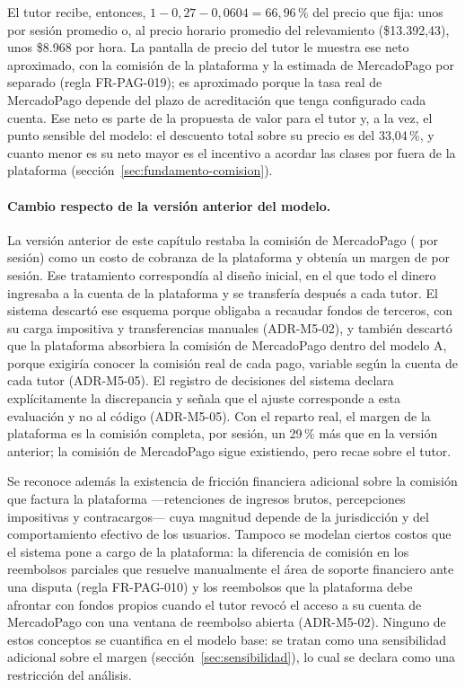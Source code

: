 El tutor recibe, entonces, $1 - 0{,}27 - 0{,}0604 = 66{,}96\,\%$ del
precio que fija: unos  por sesión promedio o, al precio horario
promedio del relevamiento (\$13.392,43), unos \$8.968 por hora. La pantalla
de precio del tutor le muestra ese neto aproximado, con la comisión de la
plataforma y la estimada de MercadoPago por separado (regla FR-PAG-019);
es aproximado porque la tasa real de MercadoPago depende del plazo de
acreditación que tenga configurado cada cuenta. Ese neto es parte de la
propuesta de valor para el tutor y, a la vez, el punto sensible del
modelo: el descuento total sobre su precio es del 33,04\,\%, y cuanto
menor es su neto mayor es el incentivo a acordar las clases por fuera de
la plataforma (sección~\ref{sec:fundamento-comision}).

\paragraph{Cambio respecto de la versión anterior del modelo.} La versión
anterior de este capítulo restaba la comisión de MercadoPago
( por sesión) como un costo de cobranza de la plataforma y
obtenía un margen de  por sesión. Ese tratamiento correspondía
al diseño inicial, en el que todo el dinero ingresaba a la cuenta de la
plataforma y se transfería después a cada tutor. El sistema descartó ese
esquema porque obligaba a recaudar fondos de terceros, con su carga
impositiva y transferencias manuales (ADR-M5-02), y también descartó que
la plataforma absorbiera la comisión de MercadoPago dentro del modelo A,
porque exigiría conocer la comisión real de cada pago, variable según la
cuenta de cada tutor (ADR-M5-05). El registro de decisiones del sistema
declara explícitamente la discrepancia y señala que el ajuste corresponde
a esta evaluación y no al código (ADR-M5-05). Con el reparto real, el
margen de la plataforma es la comisión completa,  por sesión,
un 29\,\% más que en la versión anterior; la comisión de MercadoPago sigue
existiendo, pero recae sobre el tutor.

Se reconoce además la existencia de fricción financiera adicional sobre la
comisión que factura la plataforma —retenciones de ingresos brutos,
percepciones impositivas y contracargos— cuya magnitud depende de la
jurisdicción y del comportamiento efectivo de los usuarios. Tampoco se
modelan ciertos costos que el sistema pone a cargo de la plataforma: la
diferencia de comisión en los reembolsos parciales que resuelve
manualmente el área de soporte financiero ante una disputa (regla
FR-PAG-010) y los reembolsos que la plataforma debe afrontar con fondos
propios cuando el tutor revocó el acceso a su cuenta de MercadoPago con
una ventana de reembolso abierta (ADR-M5-02). Ninguno de estos conceptos
se cuantifica en el modelo base: se tratan como una sensibilidad adicional
sobre el margen (sección~\ref{sec:sensibilidad}), lo cual se declara como
una restricción del análisis.

